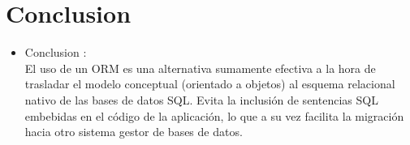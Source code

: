 \documentclass[preprint,12pt]{elsarticle}
\begin{document}
\section{Conclusion}
\begin{itemize}
\item Conclusion : \\

El uso de un ORM es una alternativa sumamente efectiva a la hora de trasladar el modelo conceptual
(orientado a objetos) al esquema relacional nativo de las bases de datos SQL. Evita la inclusión de
sentencias SQL embebidas en el código de la aplicación, lo que a su vez facilita la migración hacia otro
sistema gestor de bases de datos. 
\end{itemize}

	
	\newpage
	
	 	
		 
\citep{referencia01}  
\citep{referencia02}  
\citep{referencia03}  
\citep{referencia04}  
\citep{referencia05}  
\citep{referencia06}  
\citep {referencia07}  
\end{document}
